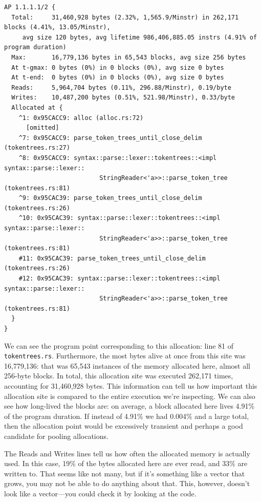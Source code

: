 \begin{verbatim}
AP 1.1.1.1/2 {
  Total:     31,460,928 bytes (2.32%, 1,565.9/Minstr) in 262,171 blocks (4.41%, 13.05/Minstr), 
     avg size 120 bytes, avg lifetime 986,406,885.05 instrs (4.91% of program duration)
  Max:       16,779,136 bytes in 65,543 blocks, avg size 256 bytes
  At t-gmax: 0 bytes (0%) in 0 blocks (0%), avg size 0 bytes
  At t-end:  0 bytes (0%) in 0 blocks (0%), avg size 0 bytes
  Reads:     5,964,704 bytes (0.11%, 296.88/Minstr), 0.19/byte
  Writes:    10,487,200 bytes (0.51%, 521.98/Minstr), 0.33/byte
  Allocated at {
    ^1: 0x95CACC9: alloc (alloc.rs:72)
      [omitted]
    ^7: 0x95CACC9: parse_token_trees_until_close_delim (tokentrees.rs:27)
    ^8: 0x95CACC9: syntax::parse::lexer::tokentrees::<impl syntax::parse::lexer::
                          StringReader<'a>>::parse_token_tree (tokentrees.rs:81)
    ^9: 0x95CAC39: parse_token_trees_until_close_delim (tokentrees.rs:26)
    ^10: 0x95CAC39: syntax::parse::lexer::tokentrees::<impl syntax::parse::lexer::
                          StringReader<'a>>::parse_token_tree (tokentrees.rs:81)
    #11: 0x95CAC39: parse_token_trees_until_close_delim (tokentrees.rs:26)
    #12: 0x95CAC39: syntax::parse::lexer::tokentrees::<impl syntax::parse::lexer::
                          StringReader<'a>>::parse_token_tree (tokentrees.rs:81)
  }
}
\end{verbatim}

We can see the program point corresponding to this allocation: line 81 of \texttt{tokentrees.rs}.
Furthermore, the most bytes alive at once from this site was 16,779,136: that was 65,543 instances of the
memory allocated here, almost all 256-byte blocks. In total, this allocation site was executed
262,171 times, accounting for 31,460,928 bytes. This information can tell us how important this
allocation site is compared to the entire execution we're inspecting. We can also see how long-lived
the blocks are: on average, a block allocated here lives 4.91\% of the program duration. If instead of
4.91\% we had 0.004\% and a large total, then the allocation point would be excessively transient and perhaps
a good candidate for pooling allocations.

The Reads and Writes lines tell us how often the allocated memory is actually used. In this case,
19\% of the bytes allocated here are ever read, and 33\% are written to. That seems like not many, but if it's something
like a vector that grows, you may not be able to do anything about that. This, however, doesn't look like a vector---you
could check it by looking at the code.

